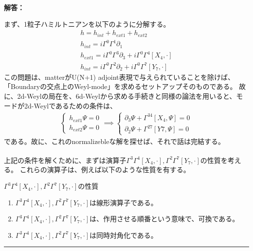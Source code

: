 \documentclass[dvipdfmx,a4paper,10.5pt]{article}
\numberwithin{equation}{section}
\newenvironment{answerbox}
{\begin{prooflabel}\textbf{解答：}\end{prooflabel}\vspace{0.8em}}
{\par\vspace{1em}\hrule\vspace{1em}}
\begin{document}
\begin{answerbox}
    まず、1粒子ハミルトニアンを以下のように分解する。
    \begin{gather*}
        h=h_{int}+h_{ext1}+h_{ext2}\\
        h_{int}=i\Gamma^{0}\Gamma^{1}\partial_{1}\\
        h_{ext1}=i\Gamma^{0}\Gamma^{3}\partial_{3}+i\Gamma^{0}\Gamma^{4}[X_{4},\cdot]\\
        h_{int}=i\Gamma^{0}\Gamma^{2}\partial_{2}+i\Gamma^{0}\Gamma^{7}[Y_{7},\cdot]
    \end{gather*}
    この問題は、matterがU(N+1) adjoint表現で与えられていることを除けば、「Boundaryの交点上のWeyl-mode」を求めるセットアップそのものである。
    故に、2d-Weylの局在を、6d-Weylから求める手続きと同様の論法を用いると、モードが2d-Weylであるための条件は、
    \begin{gather*}
        \begin{cases}
        h_{ext1}\Psi=0\\
        h_{ext2}\Psi=0
        \end{cases}
        \implies 
        \begin{cases}
        \partial_{3}\Psi+\Gamma^{34}[X_{4},\Psi]=0\\
        \partial_{2}\Psi+\Gamma^{27}[Y{7},\Psi]=0
        \end{cases}
    \end{gather*}
    である。故に、これのnormalizebleな解を探せば、それで話は完結する。\\
    \\
    上記の条件を解くために、まずは演算子$\Gamma^{3}\Gamma^{4}[X_{4},\cdot],\Gamma^{2}\Gamma^{7}[Y_{7},\cdot]$の性質を考える。
    これらの演算子は、例えば以下のような性質を有する。
    \begin{resultbox}{$\Gamma^{3}\Gamma^{4}[X_{4},\cdot],\Gamma^{2}\Gamma^{7}[Y_{7},\cdot]$の性質}
        \begin{enumerate}
            \item $\Gamma^{3}\Gamma^{4}[X_{4},\cdot],\Gamma^{2}\Gamma^{7}[Y_{7},\cdot]$は線形演算子である。
            \item $\Gamma^{3}\Gamma^{4}[X_{4},\cdot],\Gamma^{2}\Gamma^{7}[Y_{7},\cdot]$は、作用させる順番という意味で、可換である。
            \item $\Gamma^{3}\Gamma^{4}[X_{4},\cdot],\Gamma^{2}\Gamma^{7}[Y_{7},\cdot]$は同時対角化である。
        \end{enumerate}
    \end{resultbox}

\end{answerbox}
\end{document}
